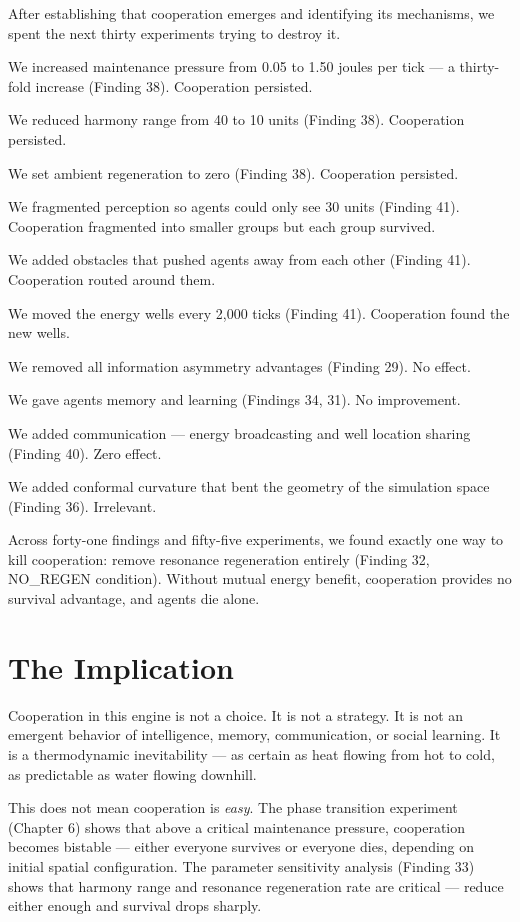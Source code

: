 After establishing that cooperation emerges and identifying its mechanisms, we spent the next thirty experiments trying to destroy it.

We increased maintenance pressure from 0.05 to 1.50 joules per tick --- a thirty-fold increase (Finding 38). Cooperation persisted.

We reduced harmony range from 40 to 10 units (Finding 38). Cooperation persisted.

We set ambient regeneration to zero (Finding 38). Cooperation persisted.

We fragmented perception so agents could only see 30 units (Finding 41). Cooperation fragmented into smaller groups but each group survived.

We added obstacles that pushed agents away from each other (Finding 41). Cooperation routed around them.

We moved the energy wells every 2,000 ticks (Finding 41). Cooperation found the new wells.

We removed all information asymmetry advantages (Finding 29). No effect.

We gave agents memory and learning (Findings 34, 31). No improvement.

We added communication --- energy broadcasting and well location sharing (Finding 40). Zero effect.

We added conformal curvature that bent the geometry of the simulation space (Finding 36). Irrelevant.

Across forty-one findings and fifty-five experiments, we found exactly one way to kill cooperation: remove resonance regeneration entirely (Finding 32, NO\_REGEN condition). Without mutual energy benefit, cooperation provides no survival advantage, and agents die alone.

\section{The Implication}\label{the-implication}

Cooperation in this engine is not a choice. It is not a strategy. It is not an emergent behavior of intelligence, memory, communication, or social learning. It is a thermodynamic inevitability --- as certain as heat flowing from hot to cold, as predictable as water flowing downhill.

This does not mean cooperation is \emph{easy}. The phase transition experiment (Chapter 6) shows that above a critical maintenance pressure, cooperation becomes bistable --- either everyone survives or everyone dies, depending on initial spatial configuration. The parameter sensitivity analysis (Finding 33) shows that harmony range and resonance regeneration rate are critical --- reduce either enough and survival drops sharply.

